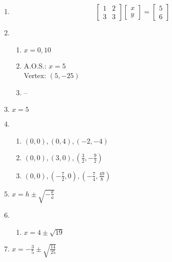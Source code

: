 \documentclass{article}
\begin{document}
\begin{enumerate}
\item 
	\begin{equation*}
	\begin{bmatrix}
	1 & 2 \\
	3 & 3
	\end{bmatrix}
	\begin{bmatrix}
	x \\
	y
	\end{bmatrix} =
	\begin{bmatrix}
	5 \\
	6
	\end{bmatrix}
	\end{equation*}
	
\item

	\begin{enumerate}
	
	\item $x = 0, 10$
	
	\item A.O.S.:  $x = 5$ \\
		Vertex: $(5, -25)$
		
	\item --
	
	\end{enumerate}
	
\item $x = 5$

\item

	\begin{enumerate}
	
	\item $(0, 0), (0, 4), (-2, -4)$
	
	\item $(0,0), (3,0), (\frac{3}{2}, -\frac{9}{2})$
	
	\item $(0,0), (-\frac{7}{2}, 0), (-\frac{7}{4}, \frac{49}{8})$
	
	\end{enumerate}
	
\item $x = h \pm \sqrt{-\frac{k}{a}}$

\item

	\begin{enumerate}
	
	\item $x = 4 \pm \sqrt{19}$
	
	\end{enumerate}
	
\item $x = -\frac{3}{5} \pm \sqrt{\frac{14}{25}}$
	
\end{enumerate}
\end{document}
